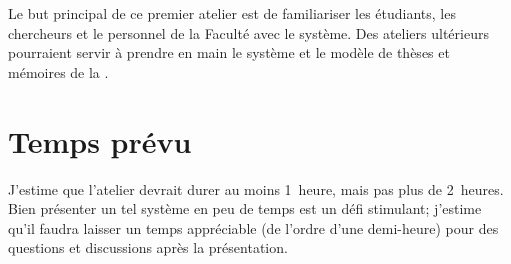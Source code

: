 \documentclass{article}
\begin{document}
\smallskip{}

Le but principal de ce premier atelier est de familiariser les étudiants, les chercheurs et le personnel de la Faculté avec le système. Des ateliers ultérieurs pourraient servir à prendre en main le système et le modèle de thèses et mémoires de la .

\section{Temps prévu}

J’estime que l’atelier devrait durer au moins 1~heure, mais pas plus de 2~heures. Bien présenter un tel système en peu de temps est un défi stimulant; j’estime qu’il faudra laisser un temps appréciable (de l’ordre d’une demi-heure) pour des questions et discussions après la présentation.
\end{document}
